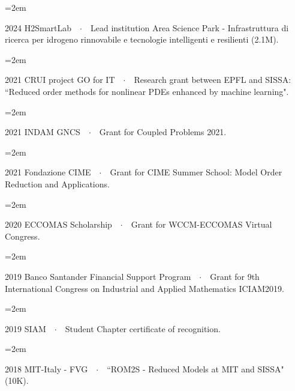 \documentclass[
  usegeometry%
]{scrartcl}
\newcommand{\Description}[1]{\hangindent=2em\hangafter=0\noindent\raggedright\footnotesize{#1}\par\normalsize\vspace{1em}} %
\begin{document}
\begin{cv}{}
\vspace{-0.5em} 

\Description{{\color{violet}2024 H2SmartLab}\ \ $\cdotp$\ \ Lead institution Area Science Park - Infrastruttura di ricerca per idrogeno rinnovabile e tecnologie intelligenti e resilienti (2.1M).}

\vspace{-0.5em} 

\Description{{\color{violet}2021 CRUI project GO for IT}\ \ $\cdotp$\ \  Research grant between EPFL and SISSA: ``Reduced order methods for nonlinear PDEs enhanced by machine learning".}

\vspace{-0.5em} 

\Description{{\color{violet}2021 INDAM GNCS}\ \ $\cdotp$\ \  Grant for Coupled Problems 2021.}

\vspace{-0.5em} 

\Description{{\color{violet}2021 Fondazione CIME}\ \ $\cdotp$\ \  Grant for CIME Summer School: Model Order Reduction and Applications.}

\vspace{-0.5em} %

\Description{{\color{violet}2020 ECCOMAS Scholarship}\ \ $\cdotp$\ \   Grant for WCCM-ECCOMAS Virtual Congress.}

\vspace{-0.5em} %

\Description{{\color{violet}2019 Banco Santander Financial Support Program}\ \ $\cdotp$\ \   Grant for 9th International Congress on Industrial and Applied Mathematics ICIAM2019.}

\vspace{-0.5em} %

\Description{{\color{violet}2019 SIAM}\ \ $\cdotp$\ \  Student Chapter certificate of recognition.}

\vspace{-0.5em} %

\Description{{\color{violet}2018 MIT-Italy - FVG}\ \ $\cdotp$\ \  ``ROM2S - Reduced Models at MIT and SISSA" (10K).}


\end{cv}
\end{document}
